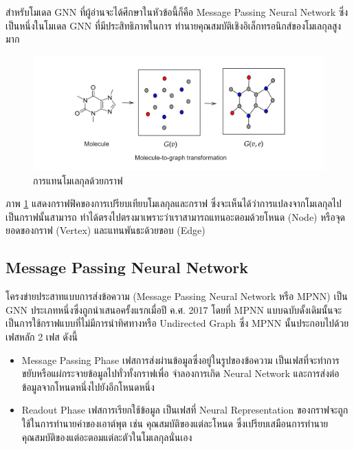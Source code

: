 สำหรับโมเดล GNN ที่ผู้อ่านจะได้ศึกษาในหัวข้อนี้ก็คือ Message Passing Neural Network ซึ่งเป็นหนึ่งในโมเดล GNN ที่มีประสิทธิภาพในการ%
ทำนายคุณสมบัติเชิงอิเล็กทรอนิกส์ของโมเลกุลสูงมาก

\begin{figure}[H]
    \centering
    \includegraphics[width=\linewidth]{fig/mol-2-graph.png}
    \caption{การแทนโมเลกุลด้วยกราฟ}
    \label{fig:mol_2_graph}
\end{figure}

ภาพ \ref{fig:mol_2_graph} แสดงกราฟฟิคของการเปรียบเทียบโมเลกุลและกราฟ ซึ่งจะเห็นได้ว่าการแปลงจากโมเลกุลไปเป็นกราฟนั้นสามารถ%
ทำได้ตรงไปตรงมาเพราะว่าเราสามารถแทนอะตอมด้วยโหนด (Node) หรือจุดยอดของกราฟ (Vertex) และแทนพันธะด้วยขอบ (Edge)

\subsection{Message Passing Neural Network}
\label{ssec:mpnn}

โครงข่ายประสาทแบบการส่งข้อความ (Message Passing Neural Network หรือ MPNN) เป็น GNN ประเภทหนึ่งซึ่งถูกนำเสนอครั้งแรกเมื่อปี 
ค.ศ. 2017\autocite{gilmer2017} โดยที่ MPNN แบบฉบับดั้งเดิมนั้นจะเป็นการใช้กราฟแบบที่ไม่มีการนำทิศทางหรือ Undirected Graph
ซึ่ง MPNN นั้นประกอบไปด้วยเฟสหลัก 2 เฟส ดังนี้ 

\begin{itemize}
    \item Message Passing Phase เฟสการส่งผ่านข้อมูลซึ่งอยู่ในรูปของข้อความ เป็นเฟสที่จะทำการขยับหรือแผ่กระจายข้อมูลไปทั่วทั้งกราฟเพื่อ%
    จำลองการเกิด Neural Network และการส่งต่อข้อมูลจากโหนดหนึ่งไปยังอีกโหนดหนึ่ง
    
    \item Readout Phase เฟสการเรียกใช้ข้อมูล เป็นเฟสที่ Neural Representation ของกราฟจะถูกใช้ในการทำนายค่าของเอาต์พุต เช่น
    คุณสมบัติของแต่ละโหนด ซึ่งเปรียบเสมือนการทำนายคุณสมบัติของแต่อะตอมแต่ละตัวในโมเลกุลนั่นเอง
\end{itemize}

